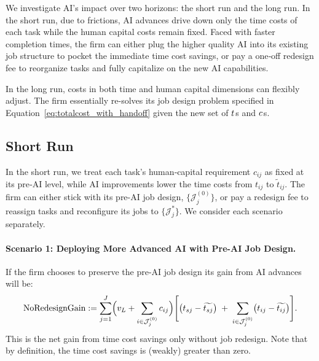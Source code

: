 \documentclass{article}
\theoremstyle{plain}
\theoremstyle{plain}
\begin{document}
We investigate AI’s impact over two horizons: the short run and the long run.
In the short run, due to frictions, AI advances drive down only the time costs of each task while the human capital costs remain fixed.
Faced with faster completion times, the firm can either plug the higher quality AI into its existing job structure to pocket the immediate time cost savings, or pay a one‐off redesign fee to reorganize tasks and fully capitalize on the new AI capabilities.

In the long run, costs in both time and human capital dimensions can flexibly adjust.
The firm essentially re-solves its job design problem specified in Equation~\ref{eq:totalcost_with_handoff} given the new set of \(t_{}\)s and \(c_{}\)s.


\subsection{Short Run}

In the short run, we treat each task’s human‐capital requirement \(c_{ij}\) as fixed at its pre‐AI level, while AI improvements lower the time costs from \(t_{ij}\) to \(\widetilde t_{ij}\).  
The firm can either stick with its pre-AI job design, \(\{\mathcal{J}_j^{(0)}\}\), or pay a redesign fee to reassign tasks and reconfigure its jobs to \(\{\mathcal{J}_j^*\}\).
We consider each scenario separately.


\paragraph{Scenario 1: Deploying More Advanced AI with Pre-AI Job Design.}
If the firm chooses to preserve the pre-AI job design its gain from AI advances will be:
\begin{equation}
\label{eq:no_redesign_gain}
\text{NoRedesignGain}
:=
\sum_{j=1}^{J}
\Bigl(v_L + \sum_{i\in\mathcal{J}_j^{(0)}}c_{ij}\Bigr)
\Biggl[
  \bigl(t_{sj} - \widetilde{t_{sj}}\bigr)
  \;+\;
  \sum_{i\in\mathcal{J}_j^{(0)}}\bigl(t_{ij} - \widetilde{t_{ij}}\bigr)
\Biggr].
\end{equation}
This is the net gain from time cost savings only without job redesign.
Note that by definition, the time cost savings is (weakly) greater than zero.
\end{document}
